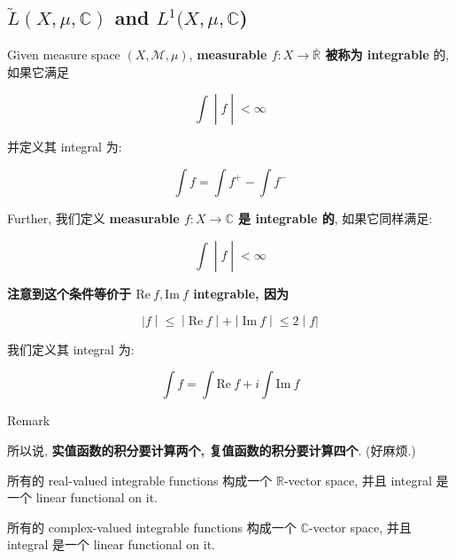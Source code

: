 \subsection{\texorpdfstring{\(\widetilde{L}(X,\mu,\mathbb{C})\) and \(L^{1}(X,\mu,\mathbb{C}\))}{\textbackslash widetilde\{L\}(X,\textbackslash mu,\textbackslash mathbb\{C\}) and L\^{}\{1\}(X,\textbackslash mu,\textbackslash mathbb\{C\})}}

\begin{definition}{}

Given measure space \((X,\mathcal{M},\mu)\), \textbf{measurable \(f:X\rightarrow\bar{\mathbb{R}}\) 被称为 integrable} 的, 如果它满足

\[\left. \int \middle| f \middle| < \infty \right.\]

并定义其 integral 为:

\[\int f = \int f^{+} - \int f^{-}\]

\end{definition}

\begin{definition}{}

Further, 我们定义 \textbf{measurable \(f:X\rightarrow\mathbb{C}\) 是 integrable 的}, 如果它同样满足:

\[\left. \int \middle| f \middle| < \infty \right.\]

\textbf{注意到这个条件等价于 \(\text{Re}\ f,\text{Im}\ f\) integrable, 因为}

\[\left. |f \middle| \leq \middle| \text{Re}\ f \middle| + \middle| \text{Im}\ f \middle| \leq 2 \middle| f| \right.\]

我们定义其 integral 为:

\[\int f = \int\text{Re}\ f + i\int\text{Im}\ f\]

\end{definition}

\begin{qlremark}{Remark}

所以说, \textbf{实值函数的积分要计算两个, 复值函数的积分要计算四个}. (好麻烦.)

\end{qlremark}

\begin{proposition}

所有的 real-valued integrable functions 构成一个 \(\mathbb{R}\)-vector space, 并且 integral 是一个 linear functional on it.

所有的 complex-valued integrable functions 构成一个 \(\mathbb{C}\)-vector space, 并且 integral 是一个 linear functional on it.

\end{proposition}

